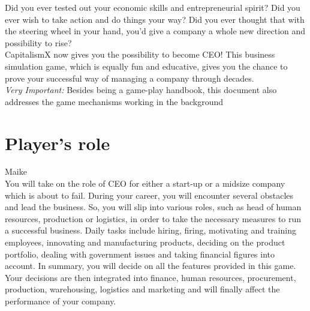 \documentclass[11pt,titlepage,oneside,openany]{book}
\begin{document}
Did you ever tested out your economic skills and entrepreneurial spirit? Did you ever wish to take action and do things your way? Did you ever thought that with the steering wheel in your hand, you'd give a company a whole new direction and possibility to rise? \\
CapitalismX now gives you the possibility to become CEO! This business simulation game, which is equally fun and educative, gives you the chance to prove your successful way of managing a company through decades.\\

\emph{Very Important:} Besides being a game-play handbook, this document also addresses the game mechanisms working in the background
 
\section{Player's role}
Maike\\
You will take on the role of CEO for either a start-up or a midsize company which is about to fail. During your career, you will encounter several obstacles and lead the business. So, you will slip into various roles, such as head of human resources, production or logistics, in order to take the necessary measures to run a successful business. Daily tasks include hiring, firing, motivating and training employees, innovating and manufacturing products, deciding on the product portfolio, dealing with government issues and taking financial figures into account. In summary, you will decide on all the features provided in this game. Your decisions are then integrated into finance, human resources, procurement, production, warehousing, logistics and marketing and will finally affect the performance of your company.
\end{document}

